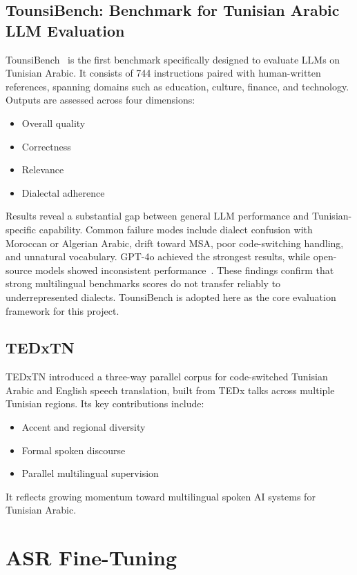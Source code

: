 \documentclass[12pt,a4paper]{report}
\begin{document}
\section{TounsiBench: Benchmark for Tunisian Arabic LLM Evaluation}
TounsiBench~\citep{hassine-etal-2025-tounsibench} is the first benchmark specifically designed to evaluate LLMs on Tunisian Arabic. It consists of 744 instructions paired with human-written references, spanning domains such as education, culture, finance, and technology. Outputs are assessed across four dimensions:
\begin{itemize}
\item Overall quality
\item Correctness
\item Relevance
\item Dialectal adherence
\end{itemize}
Results reveal a substantial gap between general LLM performance and Tunisian-specific capability. Common failure modes include dialect confusion with Moroccan or Algerian Arabic, drift toward MSA, poor code-switching handling, and unnatural vocabulary. GPT-4o achieved the strongest results, while open-source models showed inconsistent performance~\citep{benhassine2025tounsibench}.
These findings confirm that strong multilingual benchmarks scores do not transfer reliably to underrepresented dialects. TounsiBench is adopted here as the core evaluation framework for this project.
\section{TEDxTN}
TEDxTN introduced a three-way parallel corpus for code-switched Tunisian Arabic and English speech translation, built from TEDx talks across multiple Tunisian regions.
Its key contributions include:
\begin{itemize}
\item Accent and regional diversity
\item Formal spoken discourse
\item Parallel multilingual supervision
\end{itemize}
It reflects growing momentum toward multilingual spoken AI systems for Tunisian Arabic.
\chapter{ASR Fine-Tuning}
\end{document}

